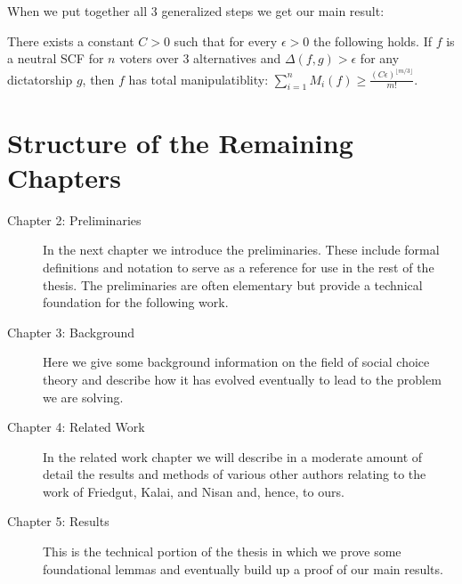 	When we put together all 3 generalized steps we get our main result:
	\begin{theorem}
		There exists a constant $C > 0$ such that for every $\epsilon > 0$ the following holds. If $f$ is a neutral SCF for $n$ voters over 3 alternatives and $\Delta(f, g) > \epsilon$ for any dictatorship $g$, then $f$ has total manipulatiblity: $\sum^n_{i=1} M_i(f) \ge \frac{(C\epsilon)^{\lfloor m/3 \rfloor}}{m!}$.
	\end{theorem}


\section{Structure of the Remaining Chapters}

	\begin{description}
		\item[Chapter 2: Preliminaries] In the next chapter we introduce the preliminaries. These include formal definitions and notation to serve as a reference for use in the rest of the thesis. The preliminaries are often elementary but provide a technical foundation for the following work.

		\item[Chapter 3: Background] Here we give some background information on the field of social choice theory and describe how it has evolved eventually to lead to the problem we are solving.

		\item[Chapter 4: Related Work] In the related work chapter we will describe in a moderate amount of detail the results and methods of various other authors relating to the work of Friedgut, Kalai, and Nisan and, hence, to ours.

		\item[Chapter 5: Results] This is the technical portion of the thesis in which we prove some foundational lemmas and eventually build up a proof of our main results.
	\end{description}
